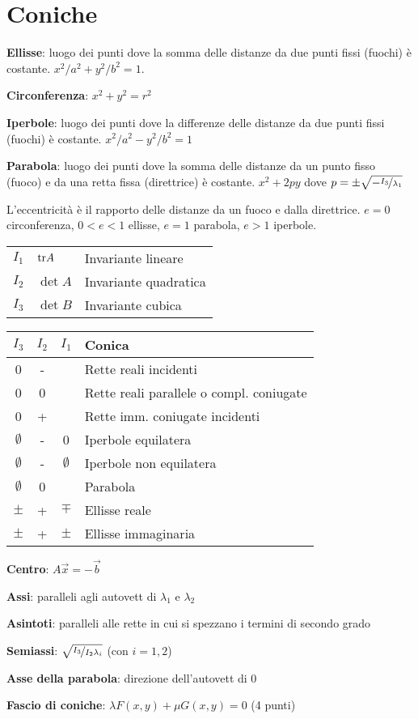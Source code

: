 \section{Coniche}

\textbf{Ellisse}: luogo dei punti dove la somma delle distanze da due punti fissi (fuochi) è costante. $x^2/a^2 + y^2/b^2 = 1$.

\textbf{Circonferenza}: $x^2+y^2=r^2$

\textbf{Iperbole}: luogo dei punti dove la differenze delle distanze da due punti fissi (fuochi) è costante. $x^2/a^2 - y^2/b^2 = 1$

\textbf{Parabola}: luogo dei punti dove la somma delle distanze da un punto fisso (fuoco) e da una retta fissa (direttrice) è costante. $x^2+2py$ dove $p=\pm \sqrt{-\nicefrac{I_3}{\lambda_1}}$

L'eccentricità è il rapporto delle distanze da un fuoco e dalla direttrice. $e = 0$ circonferenza, $0 < e < 1$ ellisse, $e = 1$ parabola, $e > 1$ iperbole. 

\begin{tabular}{lll}
	$I_1$ & $\mathrm{tr} A$ & Invariante lineare \\
	$I_2$ & $\det A$ & Invariante quadratica \\
	$I_3$ & $\det B$ & Invariante cubica
\end{tabular}

\begin{tabular}{c|c|c|l}
	\boldmath$I_3$ & \boldmath$I_2$ & \boldmath$I_1$ & \textbf{Conica} \\
	\hline
	0     & -     &       & Rette reali incidenti \\
	0     & 0     &       & Rette reali parallele o compl. coniugate \\
	0     & +     &       & Rette imm. coniugate incidenti \\
	\hline
	$\emptyset$ & -     & 0     & Iperbole equilatera \\
	$\emptyset$ & -     & $\emptyset$ & Iperbole non equilatera \\
	$\emptyset$ & 0     &       & Parabola \\
	$\pm$ & +     & $\mp$ & Ellisse reale \\
	$\pm$ & +     & $\pm$ & Ellisse immaginaria \\
	\hline
\end{tabular}

\textbf{Centro}: $A\vec{x} = -\vec{b}$

\textbf{Assi}: paralleli agli autovett di $\lambda_1$ e $\lambda_2$

\textbf{Asintoti}: paralleli alle rette in cui si spezzano i termini di secondo grado

\textbf{Semiassi}: $\sqrt{\nicefrac{I_3}{I_2\lambda_i}}$ (con $i=1,2$)

\textbf{Asse della parabola}: direzione dell'autovett di 0

\textbf{Fascio di coniche}: $\lambda F(x,y) + \mu G(x,y) = 0$ (4 punti)
